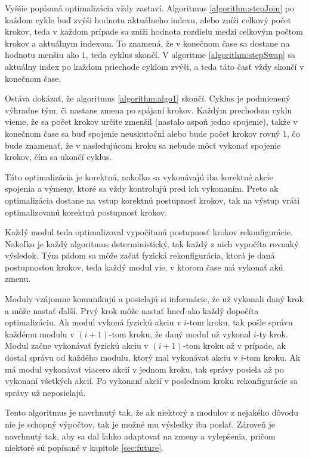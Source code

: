 \documentclass[
  digital, %
  oneside, %
  table,   %
  lof,     %
  nolot,     %
]{fithesis3}
\begin{document}
Vyššie popísaná optimalizácia vždy zastaví. Algoritmus \ref{algorithm:stepJoin} po každom cykle buď zvýši hodnotu aktuálneho indexu, alebo zníži celkový počet krokov, teda v každom prípade sa zníži hodnota rozdielu medzi celkovým počtom krokov a aktuálnym indexom. To znamená, že v konečnom čase sa dostane na hodnotu menšiu ako $1$, teda cyklus skončí. V algoritme \ref{algorithm:stepSwap} sa aktuálny index po každom priechode cyklom zvýši, a teda táto časť vždy skončí v konečnom čase. 

Ostáva dokázať, že algoritmus \ref{algorithm:algo1} skončí. Cyklus je podmienený výhradne tým, či nastane zmena po spájaní krokov. Každým prechodom cyklu vieme, že sa počet krokov určite zmenšil (nastalo aspoň jedno spojenie), takže v konečnom čase sa buď spojenie neuskutoční alebo bude počet krokov rovný $1$, čo bude znamenať, že v nasledujúcom kroku sa nebude môcť vykonať spojenie krokov, čím sa ukončí cyklus. 

Táto optimalizácia je korektná, nakoľko sa vykonávajú iba korektné akcie spojenia a výmeny, ktoré sa vždy kontrolujú pred ich vykonaním. Preto ak optimalizácia dostane na vstup korektnú postupnosť krokov, tak na výstup vráti optimalizovanú korektnú postupnosť krokov. 

Každý modul teda optimalizoval vypočítanú postupnosť krokov rekonfigurácie. Nakoľko je každý algoritmus deterministický, tak každý z nich vypočíta rovnaký výsledok. Tým pádom sa môže začať fyzická rekonfigurácia, ktorá je daná postupnosťou krokov, teda každý modul vie, v ktorom čase má vykonať akú zmenu. 

Moduly vzájomne komunikujú a posielajú si informácie, že už vykonali daný krok a môže nastať ďalší. Prvý krok môže nastať hneď ako každý dopočíta optimalizáciu. Ak modul vykoná fyzickú akciu v $i$-tom kroku, tak pošle správu každému modulu v $(i + 1)$-tom kroku, že daný modul už vykonal $i$-ty krok. Modul začne vykonávať fyzickú akciu v $(i + 1)$-tom kroku až v prípade, ak dostal správu od každého modulu, ktorý mal vykonávať akciu v $i$-tom kroku. Ak má modul vykonávať viacero akcií v jednom kroku, tak správy posiela až po vykonaní všetkých akcií. Po vykonaní akcií v poslednom kroku rekonfigurácie sa správy už neposielajú. 

Tento algoritmus je navrhnutý tak, že ak niektorý z modulov z nejakého dôvodu nie je schopný výpočtov, tak je možné mu výsledky iba poslať. Zároveň je navrhnutý tak, aby sa dal ľahko adaptovať na zmeny a vylepšenia, pričom niektoré sú popísané v kapitole \ref{sec:future}.  
\end{document}
